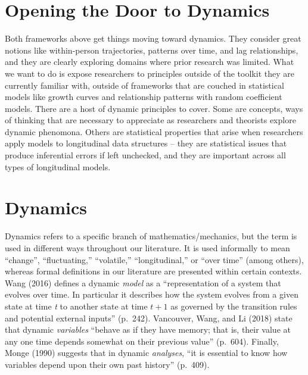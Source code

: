 \documentclass[english,,man]{apa6}
\theoremstyle{definition}
\theoremstyle{definition}
\theoremstyle{definition}
\theoremstyle{remark}
\begin{document}
\hypertarget{opening-the-door-to-dynamics}{%
\section{Opening the Door to
Dynamics}\label{opening-the-door-to-dynamics}}

Both frameworks above get things moving toward dynamics. They consider
great notions like within-person trajectories, patterns over time, and
lag relationships, and they are clearly exploring domains where prior
research was limited. What we want to do is expose researchers to
principles outside of the toolkit they are currently familiar with,
outside of frameworks that are couched in statistical models like growth
curves and relationship patterns with random coefficient models. There
are a host of dynamic principles to cover. Some are concepts, ways of
thinking that are necessary to appreciate as researchers and theorists
explore dynamic phenomona. Others are statistical properties that arise
when researchers apply models to longitudinal data structures -- they
are statistical issues that produce inferential errors if left
unchecked, and they are important across all types of longitudinal
models.

\hypertarget{dynamics}{%
\section{Dynamics}\label{dynamics}}

Dynamics refers to a specific branch of mathematics/mechanics, but the
term is used in different ways throughout our literature. It is used
informally to mean \enquote{change}, \enquote{fluctuating,}
\enquote{volatile,} \enquote{longitudinal,} or \enquote{over time}
(among others), whereas formal definitions in our literature are
presented within certain contexts. Wang (2016) defines a dynamic
\emph{model} as a \enquote{representation of a system that evolves over
time. In particular it describes how the system evolves from a given
state at time \emph{t} to another state at time \(t + 1\) as governed by
the transition rules and potential external inputs} (p.~242). Vancouver,
Wang, and Li (2018) state that dynamic \emph{variables} \enquote{behave
as if they have memory; that is, their value at any one time depends
somewhat on their previous value} (p.~604). Finally, Monge (1990)
suggests that in dynamic \emph{analyses}, \enquote{it is essential to
know how variables depend upon their own past history} (p.~409).
\end{document}
